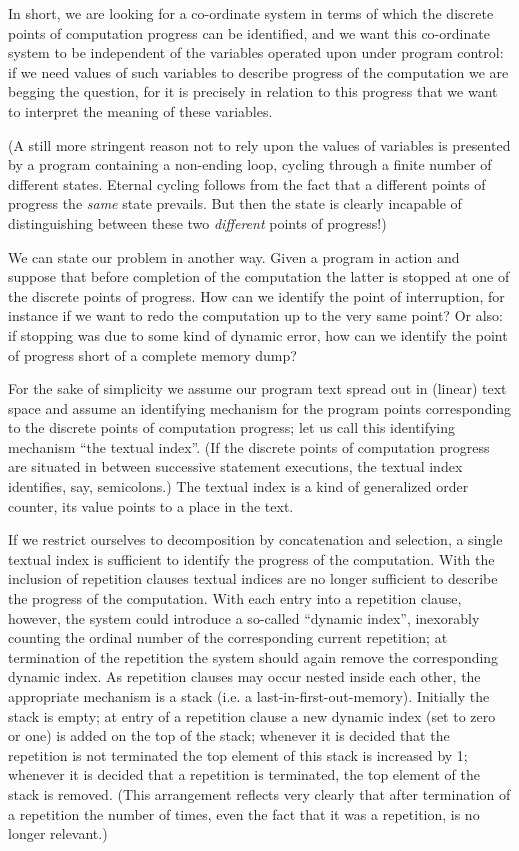 In short, we are looking for a co-ordinate system in terms of which the discrete points of computation progress can be identified, and we want this co-ordinate system to be independent of the variables operated upon under program control: if we need values of such variables to describe progress of the computation we are begging the question, for it is precisely in relation to this progress that we want to interpret the meaning of these variables.

(A still more stringent reason not to rely upon the values of variables is presented by a program containing a non-ending loop, cycling through a finite number of different states. Eternal cycling follows from the fact that a different points of progress the \textit{same} state prevails. But then the state is clearly incapable of distinguishing between these two \textit{different} points of progress!)

We can state our problem in another way. Given a program in action and suppose that before completion of the computation the latter is stopped at one of the discrete points of progress. How can we identify the point of interruption, for instance if we want to redo the computation up to the very same point? Or also: if stopping was due to some kind of dynamic error, how can we identify the point of progress short of a complete memory dump?

For the sake of simplicity we assume our program text spread out in (linear) text space and assume an identifying mechanism for the program points corresponding to the discrete points of computation progress; let us call this identifying mechanism ``the textual index''. (If the discrete points of computation progress are situated in between successive statement executions, the textual index identifies, say, semicolons.) The textual index is a kind of generalized order counter, its value points to a place in the text.

If we restrict ourselves to decomposition by concatenation and selection, a single textual index is sufficient to identify the progress of the computation. With the inclusion of repetition clauses textual indices are no longer sufficient to describe the progress of the computation. With each entry into a repetition clause, however, the system could introduce a so-called ``dynamic index'', inexorably counting the ordinal number of the corresponding current repetition; at termination of the repetition the system should again remove the corresponding dynamic index. As repetition clauses may occur nested inside each other, the appropriate mechanism is a stack (i.e. a last-in-first-out-memory). Initially the stack is empty; at entry of a repetition clause a new dynamic index (set to zero or one) is added on the top of the stack; whenever it is decided that the repetition is not terminated the top element of this stack is increased by 1; whenever it is decided that a repetition is terminated, the top element of the stack is removed. (This arrangement reflects very clearly that after termination of a repetition the number of times, even the fact that it was a repetition, is no longer relevant.)

